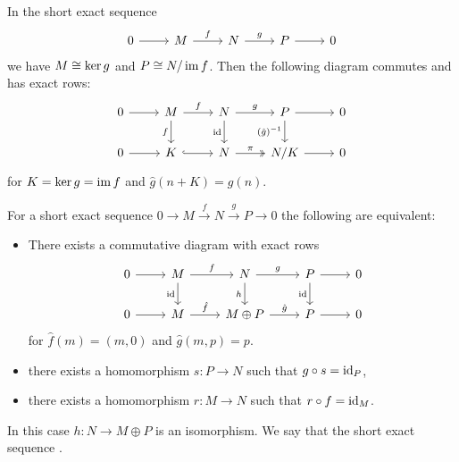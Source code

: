 \begin{remark}
  In the short exact sequence
  \[\begin{tikzcd}
	  0 & M & N & P & 0
	  \arrow[from=1-1, to=1-2]
	  \arrow["f", from=1-2, to=1-3]
	  \arrow["g", from=1-3, to=1-4]
	  \arrow[from=1-4, to=1-5]
	\end{tikzcd}\]
  we have $M \cong \operatorname{ker} g$ and $P \cong N / \operatorname{im} f$.
  Then the following diagram commutes and has exact rows:
  \[\begin{tikzcd}
	  0 & M & N & P & 0 \\
	  0 & K & N & {N/K} & 0
	  \arrow[from=1-1, to=1-2]
	  \arrow["f", from=1-2, to=1-3]
	  \arrow["f"', from=1-2, to=2-2]
	  \arrow["g", from=1-3, to=1-4]
	  \arrow["\id"', from=1-3, to=2-3]
	  \arrow[from=1-4, to=1-5]
	  \arrow["{(\hat{g})^{-1}}"', from=1-4, to=2-4]
	  \arrow[from=2-1, to=2-2]
	  \arrow["", hook, from=2-2, to=2-3]
	  \arrow["\pi", two heads, from=2-3, to=2-4]
	  \arrow[from=2-4, to=2-5]
	\end{tikzcd}\]
  for $K = \operatorname{ker} g = \operatorname{im} f$ and $\hat{g}(n + K) = g(n)$.
\end{remark}

\begin{lemma}
  For a short exact sequence $0 \to M \xrightarrow{f} N \xrightarrow{g} P \to 0$
  the following are equivalent:
  \begin{itemize}
  \item There exists a commutative diagram with exact rows
	\[
	  \begin{tikzcd}
		0 & M & N & P & 0 \\
		0 & M & M \oplus P & P & 0
		\arrow[from=1-1, to=1-2]
		\arrow["f", from=1-2, to=1-3]
		\arrow["\id"', from=1-2, to=2-2]
		\arrow["g", from=1-3, to=1-4]
		\arrow["h"', from=1-3, to=2-3]
		\arrow[from=1-4, to=1-5]
		\arrow["\id"', from=1-4, to=2-4]
		\arrow[from=2-1, to=2-2]
		\arrow["\hat{f}", from=2-2, to=2-3]
		\arrow["\hat{g}", from=2-3, to=2-4]
		\arrow[from=2-4, to=2-5]
	  \end{tikzcd}
	\]
	for $\hat{f}(m) = (m, 0)$ and $\hat{g}(m, p) = p$.
  \item there exists a homomorphism $s: P \to N$ such that $g \circ s = \operatorname{id}_P$,
  \item there exists a homomorphism $r: M \to N$ such that $r \circ f = \operatorname{id}_M$.
  \end{itemize}
  In this case $h: N \to M \oplus P$ is an isomorphism.
  We say that the short exact sequence .
\end{lemma}

